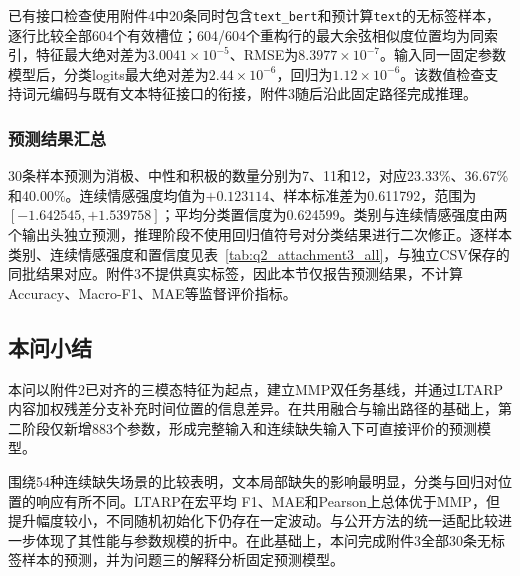 \QTwoParagraph 已有接口检查使用附件4中20条同时包含\texttt{text\_bert}和预计算\texttt{text}的无标签样本，逐行比较全部604个有效槽位；604/604个重构行的最大余弦相似度位置均为同索引，特征最大绝对差为$3.0041\times10^{-5}$、RMSE为$8.3977\times10^{-7}$。输入同一固定参数模型后，分类logits最大绝对差为$2.44\times10^{-6}$，回归为$1.12\times10^{-6}$。该数值检查支持词元编码与既有文本特征接口的衔接，附件3随后沿此固定路径完成推理。

\subsubsection{预测结果汇总}
\QTwoParagraph 30条样本预测为消极、中性和积极的数量分别为7、11和12，对应23.33\%、36.67\%和40.00\%。连续情感强度均值为$+0.123114$、样本标准差为0.611792，范围为$[-1.642545,+1.539758]$；平均分类置信度为0.624599。类别与连续情感强度由两个输出头独立预测，推理阶段不使用回归值符号对分类结果进行二次修正。逐样本类别、连续情感强度和置信度见表~\ref{tab:q2_attachment3_all}，与独立CSV保存的同批结果对应。附件3不提供真实标签，因此本节仅报告预测结果，不计算Accuracy、Macro-F1、MAE等监督评价指标。


\FloatBarrier

\subsection{本问小结}\label{subsec:q2_summary}
\QTwoParagraph 本问以附件2已对齐的三模态特征为起点，建立MMP双任务基线，并通过LTARP内容加权残差分支补充时间位置的信息差异。在共用融合与输出路径的基础上，第二阶段仅新增883个参数，形成完整输入和连续缺失输入下可直接评价的预测模型。

\QTwoParagraph 围绕54种连续缺失场景的比较表明，文本局部缺失的影响最明显，分类与回归对位置的响应有所不同。LTARP在宏平均 F1、MAE和Pearson上总体优于MMP，但提升幅度较小，不同随机初始化下仍存在一定波动。与公开方法的统一适配比较进一步体现了其性能与参数规模的折中。在此基础上，本问完成附件3全部30条无标签样本的预测，并为问题三的解释分析固定预测模型。
